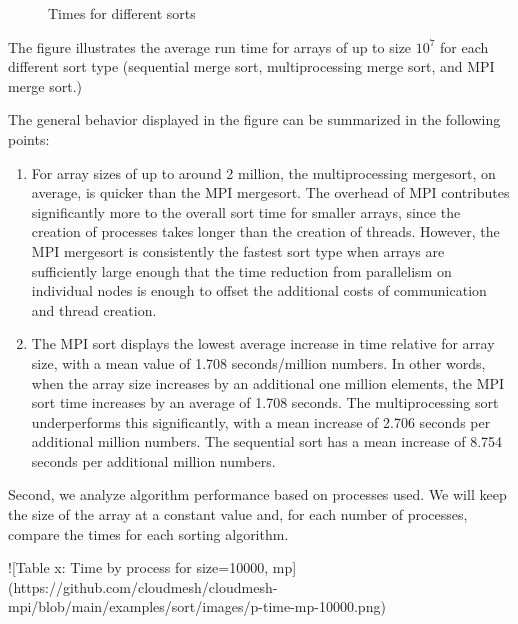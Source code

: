\begin{figure}
    \centering
    \caption{Times for different sorts}
    \label{fig:times-sort}
\end{figure}


The figure illustrates the average run time for arrays of up to size $10^7$ for each different sort type (sequential merge sort, multiprocessing merge sort, and MPI merge sort.) 

The general behavior displayed in the figure can be summarized in the following points:
\begin{enumerate}

    \item For array sizes of up to around 2 million, the multiprocessing mergesort, on average, 
    is quicker than the MPI mergesort. The overhead of MPI contributes significantly more to the 
    overall sort time for smaller arrays, since the creation of processes takes longer than the 
    creation of threads. However, the MPI mergesort is consistently the fastest sort type when arrays 
    are sufficiently large enough that the time reduction from parallelism on individual nodes is enough 
    to offset the additional costs of communication and thread creation. 

    \item The MPI sort displays the lowest average increase in time relative for array size, with a mean value of 1.708 seconds/million numbers. In other words, when the array size increases by an additional one million elements, the MPI sort time increases by an average of 1.708 seconds. The multiprocessing sort underperforms this significantly, with a mean increase of 2.706 seconds per additional million numbers. The sequential sort has a mean increase of 8.754 seconds per additional million numbers. 
\end{enumerate}

Second, we analyze algorithm performance based on processes used. We will keep the size of the array at a constant value and, for each number of processes, compare the times for each sorting algorithm. 

![Table x: Time by process for size=10000, mp](https://github.com/cloudmesh/cloudmesh-mpi/blob/main/examples/sort/images/p-time-mp-10000.png)

